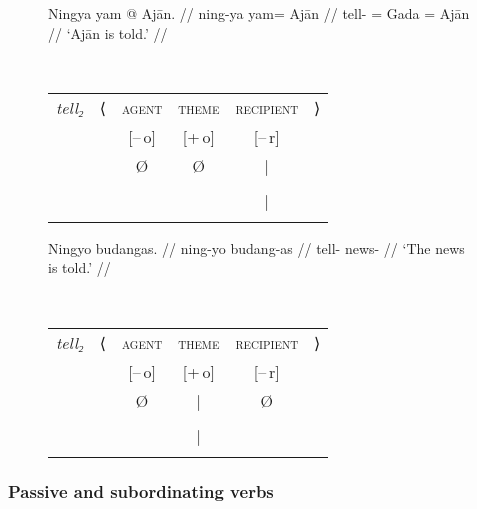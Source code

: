 \begin{figure}
\pex\label{ex:intrnzn_pass}
\a\label{ex:intrnzn_pass_1}%
\ljudge*\begin{minipage}[t]{.4\remaining}
\begingl
	\gla Ningya yam @ Ajān. //
	\glb ning-ya yam= Ajān //
	\glc tell-\TsgF{} \Top{}= Gada \Dat{}= Ajān //
	\glft `Ajān is told.' //
\endgl
\end{minipage}
~
\begin{tabular}[t]{>{\itshape}l l c c c r}
tell₂
	& ⟨
	& \textsc{agent}
	& \textsc{theme}
	& \textsc{recipient}
	& ⟩
	\\
%
	& %
	& [–\,o]
	& [+\,o]
	& [–\,r]
	& %
	\\

%
	& %
	& Ø
	& Ø
	& |
	& %
	\\

%
	& %
	& %
	& %
	& \Subj
	& %
	\\

%
	& %
	& %
	& %
	& |
	& %
	\\

%
	& %
	& %
	& %
	& \fw{Ajān}
	& %
	\\
\end{tabular}

\a\label{ex:intrnzn_pass_2}%
\begin{minipage}[t]{.4\remaining}
\begingl
	\gla Ningyo budangas. //
	\glb ning-yo budang-as //
	\glc tell-\TsgN{} news-\Parg{} //
	\glft `The news is told.' //
\endgl
\end{minipage}
~
\begin{tabular}[t]{>{\itshape}l l c c c r}
tell₂
	& ⟨
	& \textsc{agent}
	& \textsc{theme}
	& \textsc{recipient}
	& ⟩
	\\
%
	& %
	& [–\,o]
	& [+\,o]
	& [–\,r]
	& %
	\\

%
	& %
	& Ø
	& |
	& Ø
	& %
	\\

%
	& %
	& %
	& \Subj
	& %
	& %
	\\

%
	& %
	& %
	& |
	& %
	& %
	\\

%
	& %
	& %
	& \fw{news}
	& %
	& %
	\\
\end{tabular}

\xe
\end{figure}

\subsubsection{Passive and subordinating verbs}

